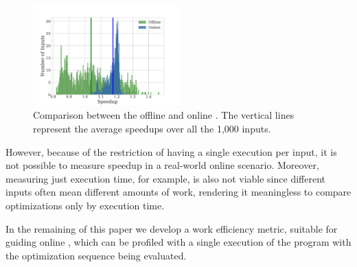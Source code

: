 \begin{figure}[ht]
    \centering
    \includegraphics[width=0.5\textwidth]{figs/motivation.pdf}
    \caption{Comparison between the offline and online {\itercomp}.
             The vertical lines represent the average speedups over
             all the 1,000 inputs.
             }
    \label{fig:motivation}
\end{figure}


However, because of the restriction of having a single execution per input,
it is not possible to measure speedup in a real-world online scenario.
Moreover, measuring just execution time, for example, is also not viable since
different inputs often mean different amounts of work,
rendering it meaningless to compare optimizations only by execution time.

In the remaining of this paper we develop a work efficiency metric, suitable
for guiding online {\itercomp}, which can be profiled with a single execution
of the program with the optimization sequence being evaluated.

